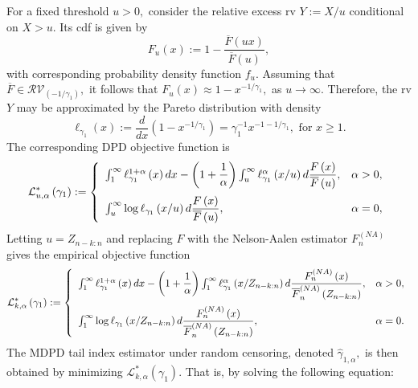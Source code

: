 \documentclass[reqno,openbib,runningheads,a4paper,12pt]{amsart}%
\begin{document}
\noindent For a fixed threshold $u>0,$ consider the relative excess rv
$Y:=X/u$ conditional on $X>u.$ Its cdf is given by
\[
F_{u}\left(  x\right)  :=1-\frac{\overline{F}\left(  ux\right)  }{\overline
{F}\left(  u\right)  },
\]
with corresponding probability density function $f_{u}.$ Assuming that
$\overline{F}\in\mathcal{RV}_{\left(  -1/\gamma_{1}\right)  },$ it follows
that $F_{u}\left(  x\right)  \approx1-x^{-1/\gamma_{1}},$ as $u\rightarrow
\infty.$ Therefore, the rv $Y$ may be approximated by the Pareto distribution
with density
\[
\ell_{\gamma_{1}}\left(  x\right)  :=\frac{d}{dx}\left(  1-x^{-1/\gamma_{1}%
}\right)  =\gamma_{1}^{-1}x^{-1-1/\gamma_{1}},\text{ for }x\geq1.
\]
The corresponding DPD objective function is
\begin{equation}
\mathcal{L}_{u,\alpha}^{\ast}\left(  \gamma_{1}\right)  :=\left\{
\begin{array}
[c]{lc}%
\int_{1}^{\infty}\ell_{\gamma_{1}}^{1+\alpha}\left(  x\right)  dx-\left(
1+\dfrac{1}{\alpha}\right)  \int_{u}^{\infty}\ell_{\gamma_{1}}^{\alpha}\left(
x/u\right)  d\dfrac{F\left(  x\right)  }{\overline{F}\left(  u\right)  }, &
\alpha>0,\medskip\\
\int_{u}^{\infty}\log\ell_{\gamma_{1}}\left(  x/u\right)  d\dfrac{F\left(
x\right)  }{\overline{F}\left(  u\right)  }, & \alpha=0,
\end{array}
\right.  \label{L}%
\end{equation}
Letting $u=Z_{n-k:n}$ and replacing $F$ with the Nelson-Aalen estimator
$F_{n}^{\left(  NA\right)  }$ gives the empirical objective function\textbf{ }%
\begin{equation}
\mathcal{L}_{k,\alpha}^{\ast}\left(  \gamma_{1}\right)  :=\left\{
\begin{array}
[c]{lc}%
\int_{1}^{\infty}\ell_{\gamma_{1}}^{1+\alpha}\left(  x\right)  dx-\left(
1+\dfrac{1}{\alpha}\right)  \int_{1}^{\infty}\ell_{\gamma_{1}}^{\alpha}\left(
x/Z_{n-k:n}\right)  d\dfrac{F_{n}^{\left(  NA\right)  }\left(  x\right)
}{\overline{F}_{n}^{\left(  NA\right)  }\left(  Z_{n-k:n}\right)  }, &
\alpha>0,\medskip\\
\int_{1}^{\infty}\log\ell_{\gamma_{1}}\left(  x/Z_{n-k:n}\right)
d\dfrac{F_{n}^{\left(  NA\right)  }\left(  x\right)  }{\overline{F}%
_{n}^{\left(  NA\right)  }\left(  Z_{n-k:n}\right)  }, & \alpha=0.
\end{array}
\right.  \label{emp-L}%
\end{equation}
The MDPD tail index estimator under random censoring, denoted $\widehat{\gamma
}_{1,\alpha},$ is then obtained by minimizing $\mathcal{L}_{k,\alpha}^{\ast
}\left(  \gamma_{1}\right)  .$ That is, by solving the following equation:
\end{document}
